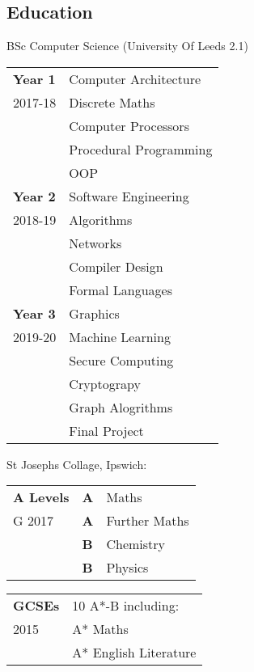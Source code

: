 \documentclass[9pt,a4paper]{article}
\begin{document}
\begin{multicols*}{2}
  \section*{Education}
  BSc Computer Science 
  \newline (University Of Leeds 2.1)
\begin{center}
  \begin{tabular}{p{1.2cm}p{5.4cm}}
    \textbf{Year 1}&Computer Architecture\\
	2017-18&Discrete Maths\\
			&Computer Processors\\
	    &Procedural Programming\\
      &OOP\vspace{.3cm}\\
    \textbf{Year 2}&Software Engineering\\
    2018-19&Algorithms\\
    &Networks\\
    &Compiler Design\\
    &Formal Languages\vspace{.3cm}\\
    \textbf{Year 3}&Graphics\\
    2019-20&Machine Learning\\
    &Secure Computing\\
    &Cryptograpy\\
    &Graph Alogrithms\\
    &Final Project
  \end{tabular}
\end{center}
  St Josephs Collage, Ipswich:
\begin{center}
  \begin{tabular}{p{1.5cm} p{0.3cm} p{5.4cm}}
    \textbf{A Levels}&\textbf{A}&Maths\\
G	2017&\textbf{A}&Further Maths\\
	    &\textbf{B}&Chemistry\\
	    &\textbf{B}&Physics\\
  \end{tabular}
  \begin{tabular}{p{1.5cm} p{5.7cm}}
    \textbf{GCSEs}
        & 10 A*-B including:\\
        2015&A* Maths\\
        &A* English Literature
  \end{tabular}
\end{center}


\end{multicols*}
\end{document}
